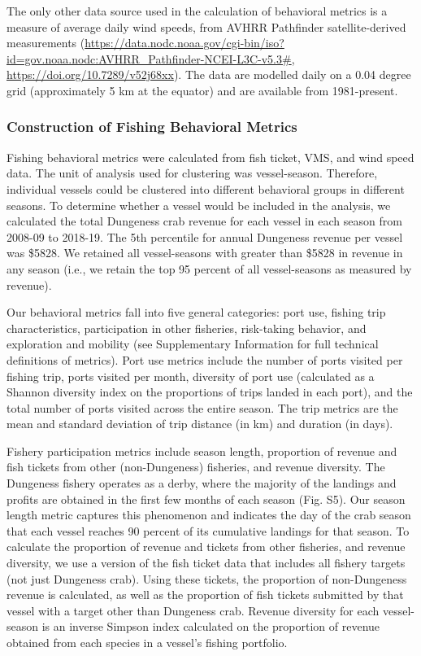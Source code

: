 \documentclass[9pt,twocolumn,twoside,lineno]{pnas-new}
\begin{document}
The only other data source used in the calculation of behavioral metrics
is a measure of average daily wind speeds, from AVHRR Pathfinder
satellite-derived measurements
(\url{https://data.nodc.noaa.gov/cgi-bin/iso?id=gov.noaa.nodc:AVHRR_Pathfinder-NCEI-L3C-v5.3\#},
\url{https://doi.org/10.7289/v52j68xx}). The data are modelled daily on
a 0.04 degree grid (approximately 5 km at the equator) and are available
from 1981-present.

\hypertarget{construction-of-fishing-behavioral-metrics}{%
\subsubsection*{Construction of Fishing Behavioral
Metrics}\label{construction-of-fishing-behavioral-metrics}}

Fishing behavioral metrics were calculated from fish ticket, VMS, and
wind speed data. The unit of analysis used for clustering was
vessel-season. Therefore, individual vessels could be clustered into
different behavioral groups in different seasons. To determine whether a
vessel would be included in the analysis, we calculated the total
Dungeness crab revenue for each vessel in each season from 2008-09 to
2018-19. The 5th percentile for annual Dungeness revenue per vessel was
\$5828. We retained all vessel-seasons with greater than \$5828 in
revenue in any season (i.e., we retain the top 95 percent of all
vessel-seasons as measured by revenue).

Our behavioral metrics fall into five general categories: port use,
fishing trip characteristics, participation in other fisheries,
risk-taking behavior, and exploration and mobility (see Supplementary
Information for full technical definitions of metrics). Port use metrics
include the number of ports visited per fishing trip, ports visited per
month, diversity of port use (calculated as a Shannon diversity index on
the proportions of trips landed in each port), and the total number of
ports visited across the entire season. The trip metrics are the mean
and standard deviation of trip distance (in km) and duration (in days).

Fishery participation metrics include season length, proportion of
revenue and fish tickets from other (non-Dungeness) fisheries, and
revenue diversity. The Dungeness fishery operates as a derby, where the
majority of the landings and profits are obtained in the first few
months of each season (Fig. S5). Our season length metric captures this
phenomenon and indicates the day of the crab season that each vessel
reaches 90 percent of its cumulative landings for that season. To
calculate the proportion of revenue and tickets from other fisheries,
and revenue diversity, we use a version of the fish ticket data that
includes all fishery targets (not just Dungeness crab). Using these
tickets, the proportion of non-Dungeness revenue is calculated, as well
as the proportion of fish tickets submitted by that vessel with a target
other than Dungeness crab. Revenue diversity for each vessel-season is
an inverse Simpson index calculated on the proportion of revenue
obtained from each species in a vessel's fishing portfolio.
\end{document}
